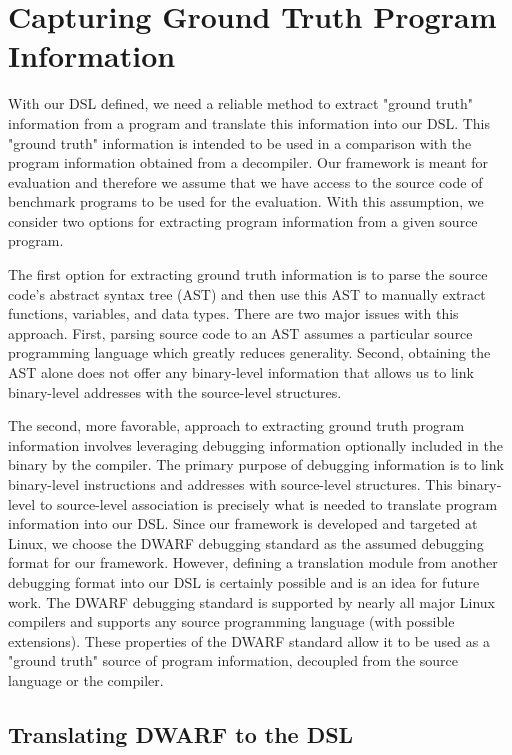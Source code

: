 \section{Capturing Ground Truth Program Information}

With our DSL defined, we need a reliable method to extract "ground truth" information from a program and translate this information into our DSL. This "ground truth" information is intended to be used in a comparison with the program information obtained from a decompiler. Our framework is meant for evaluation and therefore we assume that we have access to the source code of benchmark programs to be used for the evaluation. With this assumption, we consider two options for extracting program information from a given source program.

The first option for extracting ground truth information is to parse the source code's abstract syntax tree (AST) and then use this AST to manually extract functions, variables, and data types. There are two major issues with this approach. First, parsing source code to an AST assumes a particular source programming language which greatly reduces generality. Second, obtaining the AST alone does not offer any binary-level information that allows us to link binary-level addresses with the source-level structures.

The second, more favorable, approach to extracting ground truth program information involves leveraging debugging information optionally included in the binary by the compiler. The primary purpose of debugging information is to link binary-level instructions and addresses with source-level structures. This binary-level to source-level association is precisely what is needed to translate program information into our DSL. Since our framework is developed and targeted at Linux, we choose the DWARF debugging standard as the assumed debugging format for our framework. However, defining a translation module from another debugging format into our DSL is certainly possible and is an idea for future work. The DWARF debugging standard is supported by nearly all major Linux compilers and supports any source programming language (with possible extensions). These properties of the DWARF standard allow it to be used as a "ground truth" source of program information, decoupled from the source language or the compiler.

\subsection{Translating DWARF to the DSL}

